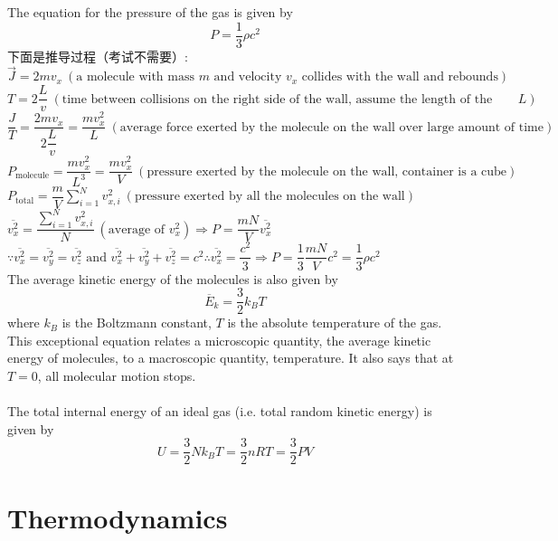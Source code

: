 The equation for the pressure of the gas is given by
\[P=\dfrac{1}{3}\rho c^2\]
下面是推导过程（考试不需要）:\\
$\vec{J}=2mv_x\ (\text{a molecule with mass $m$ and velocity $v_x$ collides with the wall and rebounds})$\\
$T=2\dfrac{L}{v}\ (\text{time between collisions on the right side of the wall, assume the length of the container is $L$})$\\
$\dfrac{J}{T}=\dfrac{2mv_x}{2\dfrac{L}{v}}=\dfrac{mv_x^2}{L}\ (\text{average force exerted by the molecule on the wall over large amount of time})$\\
$P_\text{molecule}=\dfrac{mv_x^2}{L^3}=\dfrac{mv_x^2}{V}\ (\text{pressure exerted by the molecule on the wall, container is a cube})$\\
$\displaystyle P_\text{total}=\dfrac{m}{V}\sum_{i=1}^{N}v_{x,i}^2\ (\text{pressure exerted by all the molecules on the wall})$\\
$\overline{v_x^2}=\dfrac{\sum_{i=1}^{N}v_{x,i}^2}{N}\ (\text{average of $v_x^2$}) \Rightarrow P=\dfrac{mN}{V}\overline{v_x^2}$\\
$\because \overline{v_x^2}=\overline{v_y^2}=\overline{v_z^2}\text{ and } \overline{v_x^2}+\overline{v_y^2}+\overline{v_z^2}=c^2 \therefore \overline{v_x^2}=\dfrac{c^2}{3} \Rightarrow P=\dfrac{1}{3}\dfrac{mN}{V}c^2=\dfrac{1}{3}\rho c^2$\\
The average kinetic energy of the molecules is also given by
\[ \overline{E}_k = \dfrac{3}{2}k_BT\]
where $k_B$ is the Boltzmann constant, $T$ is the absolute temperature of the gas.\\
This exceptional equation relates a microscopic quantity, the average kinetic energy of molecules, to a macroscopic quantity, temperature. It also says that at $T = 0$, all molecular motion stops.\\\\
The total internal energy of an ideal gas (i.e. total random kinetic energy) is given by
\[U=\dfrac{3}{2}Nk_BT=\dfrac{3}{2}nRT=\dfrac{3}{2}PV\]
\section{Thermodynamics}
